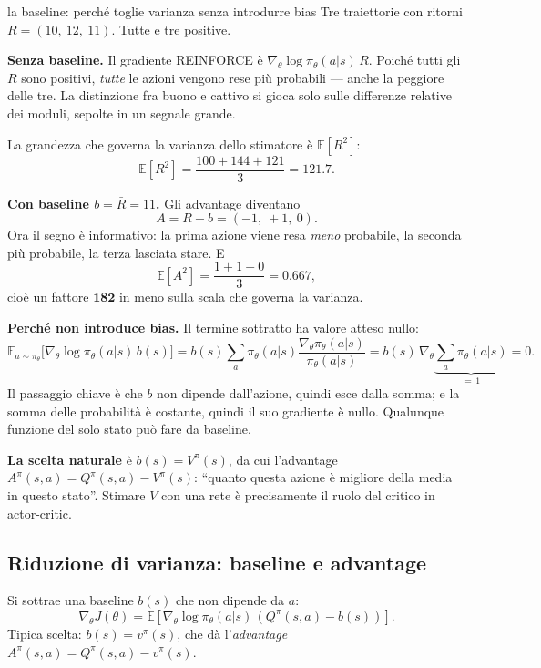 \begin{esempiosvolto}{la baseline: perché toglie varianza senza introdurre bias}
Tre traiettorie con ritorni $R = (10,\ 12,\ 11)$. Tutte e tre positive.

\medskip
\textbf{Senza baseline.} Il gradiente REINFORCE è $\nabla_\theta \log \pi_\theta(a|s)\, R$. Poiché tutti gli $R$ sono positivi, \emph{tutte} le azioni vengono rese più probabili — anche la peggiore delle tre. La distinzione fra buono e cattivo si gioca solo sulle differenze relative dei moduli, sepolte in un segnale grande.

La grandezza che governa la varianza dello stimatore è $\mathbb{E}[R^2]$:
\[
\mathbb{E}[R^2] = \frac{100 + 144 + 121}{3} = 121.7.
\]

\medskip
\textbf{Con baseline $b = \bar R = 11$.} Gli advantage diventano
\[
A = R - b = (-1,\ +1,\ 0).
\]
Ora il segno è informativo: la prima azione viene resa \emph{meno} probabile, la seconda più probabile, la terza lasciata stare. E
\[
\mathbb{E}[A^2] = \frac{1 + 1 + 0}{3} = 0.667,
\]
cioè un fattore $\mathbf{182}$ in meno sulla scala che governa la varianza.

\medskip
\textbf{Perché non introduce bias.} Il termine sottratto ha valore atteso nullo:
\[
\mathbb{E}_{a \sim \pi_\theta}\big[\nabla_\theta \log \pi_\theta(a|s)\, b(s)\big]
= b(s) \sum_a \pi_\theta(a|s) \frac{\nabla_\theta \pi_\theta(a|s)}{\pi_\theta(a|s)}
= b(s)\, \nabla_\theta \underbrace{\sum_a \pi_\theta(a|s)}_{=\,1} = 0.
\]
Il passaggio chiave è che $b$ non dipende dall'azione, quindi esce dalla somma; e la somma delle probabilità è costante, quindi il suo gradiente è nullo. Qualunque funzione del solo stato può fare da baseline.

\textbf{La scelta naturale} è $b(s) = V^\pi(s)$, da cui l'advantage $A^\pi(s,a) = Q^\pi(s,a) - V^\pi(s)$: ``quanto questa azione è migliore della media in questo stato''. Stimare $V$ con una rete è precisamente il ruolo del critico in actor-critic.
\end{esempiosvolto}

\subsection{Riduzione di varianza: baseline e advantage}
Si sottrae una baseline $b(s)$ che non dipende da $a$:
\[
\nabla_\theta J(\theta) = \mathbb{E}\!\left[\nabla_\theta \log \pi_\theta(a|s)\, (Q^\pi(s,a) - b(s))\right].
\]
Tipica scelta: $b(s) = v^\pi(s)$, che dà l'\emph{advantage} $A^\pi(s,a) = Q^\pi(s,a) - v^\pi(s)$.

